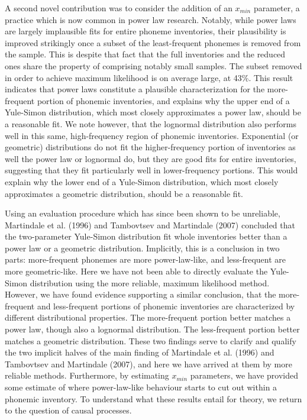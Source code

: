 A second novel contribution was to consider the addition of an \(x_{min}\) parameter, a practice which is now common in power law research. Notably, while power laws are largely implausible fits for entire phoneme inventories, their plausibility is improved strikingly once a subset of the least-frequent phonemes is removed from the sample. This is despite that fact that the full inventories and the reduced ones share the property of comprising notably small samples. The subset removed in order to achieve maximum likelihood is on average large, at 43\%. This result indicates that power laws constitute a plausible characterization for the more-frequent portion of phonemic inventories, and explains why the upper end of a Yule-Simon distribution, which most closely approximates a power law, should be a reasonable fit. We note however, that the lognormal distribution also performs well in this same, high-frequency region of phonemic inventories. Exponential (or geometric) distributions do not fit the higher-frequency portion of inventories as well the power law or lognormal do, but they are good fits for entire inventories, suggesting that they fit particularly well in lower-frequency portions. This would explain why the lower end of a Yule-Simon distribution, which most closely approximates a geometric distribution, should be a reasonable fit.

Using an evaluation procedure which has since been shown to be unreliable, Martindale et al. (1996) and Tambovtsev and Martindale (2007) concluded that the two-parameter Yule-Simon distribution fit whole inventories better than a power law or a geometric distribution. Implicitly, this is a conclusion in two parts: more-frequent phonemes are more power-law-like, and less-frequent are more geometric-like. Here we have not been able to directly evaluate the Yule-Simon distribution using the more reliable, maximum likelihood method. However, we have found evidence supporting a similar conclusion, that the more-frequent and less-frequent portions of phonemic inventories are characterized by different distributional properties. The more-frequent portion better matches a power law, though also a lognormal distribution. The less-frequent portion better matches a geometric distribution. These two findings serve to clarify and qualify the two implicit halves of the main finding of Martindale et al. (1996) and Tambovtsev and Martindale (2007), and here we have arrived at them by more reliable methods. Furthermore, by estimating \(x_{min}\) parameters, we have provided some estimate of where power-law-like behaviour starts to cut out within a phonemic inventory. To understand what these results entail for theory, we return to the question of causal processes. \newline

